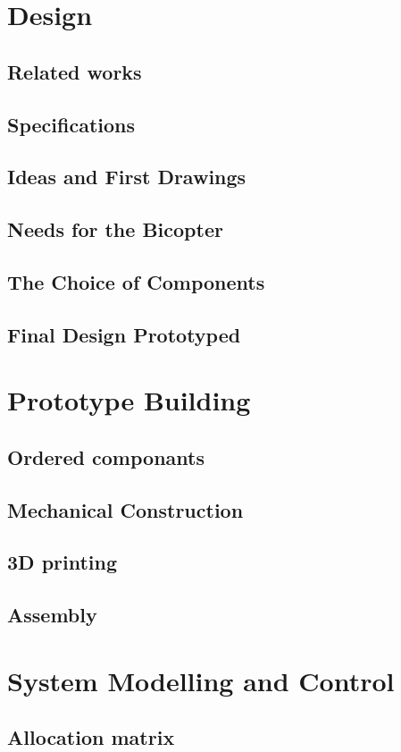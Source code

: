 \chapter{Design}
\label{sec:design}
\section{Related works}
\section{Specifications}
\section{Ideas and First Drawings}
\section{Needs for the Bicopter}
\section{The Choice of Components}
\section{Final Design Prototyped}

\chapter{Prototype Building}
\label{sec:protoBuild}
\section{Ordered componants}
\section{Mechanical Construction}
\section{3D printing}
\section{Assembly}
\chapter{System Modelling and Control}
\label{sec:latexumg}
\section{Allocation matrix}

